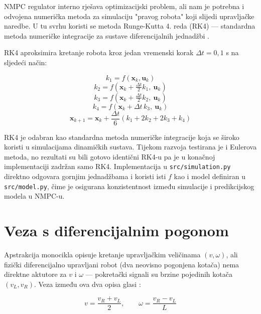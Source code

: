 NMPC regulator interno rješava optimizacijski problem, ali nam je potrebna i odvojena numerička metoda za simulaciju "pravog robota" koji slijedi upravljačke naredbe. U tu svrhu koristi se metoda Runge-Kutta 4. reda (RK4) --- standardna metoda numeričke integracije za sustave diferencijalnih jednadžbi \cite{hairer1993ode}.

RK4 aproksimira kretanje robota kroz jedan vremenski korak $\Delta t = 0{,}1$ s na sljedeći način:

\begin{equation}
  k_1 = f(\mathbf{x}_k, \mathbf{u}_k)
\end{equation}
\begin{equation}
  k_2 = f\!\left(\mathbf{x}_k + \tfrac{\Delta t}{2}k_1,\ \mathbf{u}_k\right)
\end{equation}
\begin{equation}
  k_3 = f\!\left(\mathbf{x}_k + \tfrac{\Delta t}{2}k_2,\ \mathbf{u}_k\right)
\end{equation}
\begin{equation}
  k_4 = f(\mathbf{x}_k + \Delta t\, k_3,\ \mathbf{u}_k)
\end{equation}
\begin{equation}
  \mathbf{x}_{k+1} = \mathbf{x}_k + \frac{\Delta t}{6}(k_1 + 2k_2 + 2k_3 + k_4)
\end{equation}

RK4 je odabran kao standardna metoda numeričke integracije koja se široko koristi u simulacijama dinamičkih sustava. Tijekom razvoja testirana je i Eulerova metoda, no rezultati su bili gotovo identični RK4-u pa je u konačnoj implementaciji zadržan samo RK4. Implementacija u \texttt{src/simulation.py} direktno odgovara gornjim jednadžbama i koristi isti $f$ kao i model definiran u \texttt{src/model.py}, čime je osigurana konzistentnost između simulacije i predikcijskog modela u NMPC-u.

\section{Veza s diferencijalnim pogonom}
\label{sec:diff_drive}

Apstrakcija monocikla opisuje kretanje upravljačkim veličinama $(v, \omega)$, ali fizički diferencijalno upravljani robot (dva neovisno pogonjena kotača) nema direktne aktutore za $v$ i $\omega$ --- pokretački signali su brzine pojedinih kotača $(v_L, v_R)$. Veza između ova dva opisa glasi \cite{siciliano2009robotics}:

\begin{equation}
  v = \frac{v_R + v_L}{2}, \qquad \omega = \frac{v_R - v_L}{L}
\end{equation}


